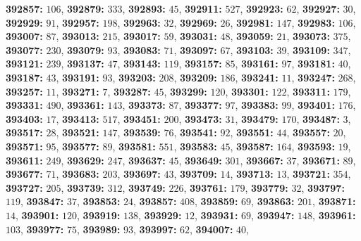 \textsf{\bfseries 392857:} $106$, \textsf{\bfseries 392879:} $333$, \textsf{\bfseries 392893:} $45$, \textsf{\bfseries 392911:} $527$, \textsf{\bfseries 392923:} $62$, \textsf{\bfseries 392927:} $30$, \textsf{\bfseries 392929:} $91$, \textsf{\bfseries 392957:} $198$, \textsf{\bfseries 392963:} $32$, \textsf{\bfseries 392969:} $26$, \textsf{\bfseries 392981:} $147$, \textsf{\bfseries 392983:} $106$, \textsf{\bfseries 393007:} $87$, \textsf{\bfseries 393013:} $215$, \textsf{\bfseries 393017:} $59$, \textsf{\bfseries 393031:} $48$, \textsf{\bfseries 393059:} $21$, \textsf{\bfseries 393073:} $375$, \textsf{\bfseries 393077:} $230$, \textsf{\bfseries 393079:} $93$, \textsf{\bfseries 393083:} $71$, \textsf{\bfseries 393097:} $67$, \textsf{\bfseries 393103:} $39$, \textsf{\bfseries 393109:} $347$, \textsf{\bfseries 393121:} $239$, \textsf{\bfseries 393137:} $47$, \textsf{\bfseries 393143:} $119$, \textsf{\bfseries 393157:} $85$, \textsf{\bfseries 393161:} $97$, \textsf{\bfseries 393181:} $40$, \textsf{\bfseries 393187:} $43$, \textsf{\bfseries 393191:} $93$, \textsf{\bfseries 393203:} $208$, \textsf{\bfseries 393209:} $186$, \textsf{\bfseries 393241:} $11$, \textsf{\bfseries 393247:} $268$, \textsf{\bfseries 393257:} $11$, \textsf{\bfseries 393271:} $7$, \textsf{\bfseries 393287:} $45$, \textsf{\bfseries 393299:} $120$, \textsf{\bfseries 393301:} $122$, \textsf{\bfseries 393311:} $179$, \textsf{\bfseries 393331:} $490$, \textsf{\bfseries 393361:} $143$, \textsf{\bfseries 393373:} $87$, \textsf{\bfseries 393377:} $97$, \textsf{\bfseries 393383:} $99$, \textsf{\bfseries 393401:} $176$, \textsf{\bfseries 393403:} $17$, \textsf{\bfseries 393413:} $517$, \textsf{\bfseries 393451:} $200$, \textsf{\bfseries 393473:} $31$, \textsf{\bfseries 393479:} $170$, \textsf{\bfseries 393487:} $3$, \textsf{\bfseries 393517:} $28$, \textsf{\bfseries 393521:} $147$, \textsf{\bfseries 393539:} $76$, \textsf{\bfseries 393541:} $92$, \textsf{\bfseries 393551:} $44$, \textsf{\bfseries 393557:} $20$, \textsf{\bfseries 393571:} $95$, \textsf{\bfseries 393577:} $89$, \textsf{\bfseries 393581:} $551$, \textsf{\bfseries 393583:} $45$, \textsf{\bfseries 393587:} $164$, \textsf{\bfseries 393593:} $19$, \textsf{\bfseries 393611:} $249$, \textsf{\bfseries 393629:} $247$, \textsf{\bfseries 393637:} $45$, \textsf{\bfseries 393649:} $301$, \textsf{\bfseries 393667:} $37$, \textsf{\bfseries 393671:} $89$, \textsf{\bfseries 393677:} $71$, \textsf{\bfseries 393683:} $203$, \textsf{\bfseries 393697:} $43$, \textsf{\bfseries 393709:} $14$, \textsf{\bfseries 393713:} $13$, \textsf{\bfseries 393721:} $354$, \textsf{\bfseries 393727:} $205$, \textsf{\bfseries 393739:} $312$, \textsf{\bfseries 393749:} $226$, \textsf{\bfseries 393761:} $179$, \textsf{\bfseries 393779:} $32$, \textsf{\bfseries 393797:} $119$, \textsf{\bfseries 393847:} $37$, \textsf{\bfseries 393853:} $24$, \textsf{\bfseries 393857:} $408$, \textsf{\bfseries 393859:} $69$, \textsf{\bfseries 393863:} $201$, \textsf{\bfseries 393871:} $14$, \textsf{\bfseries 393901:} $120$, \textsf{\bfseries 393919:} $138$, \textsf{\bfseries 393929:} $12$, \textsf{\bfseries 393931:} $69$, \textsf{\bfseries 393947:} $148$, \textsf{\bfseries 393961:} $103$, \textsf{\bfseries 393977:} $75$, \textsf{\bfseries 393989:} $93$, \textsf{\bfseries 393997:} $62$, \textsf{\bfseries 394007:} $40$, 
